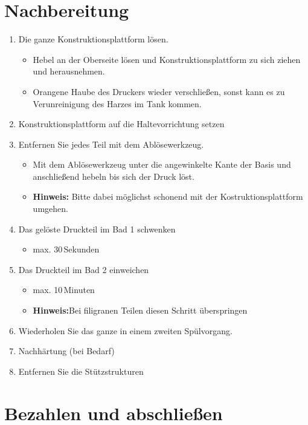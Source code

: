 \documentclass{\basedir/fablab-document}
\begin{document}
	
\section{Nachbereitung}

	\begin{enumerate}
	\item Die ganze Konstruktionsplattform lösen.
	\begin{itemize}
		\item Hebel an der Oberseite lösen und Konstruktionsplattform zu sich ziehen und herausnehmen.
		\item Orangene Haube des Druckers wieder verschließen, sonst kann es zu Verunreinigung des Harzes im Tank kommen.
	\end{itemize}
	\item Konstruktionsplattform auf die Haltevorrichtung setzen
	\item Entfernen Sie jedes Teil mit dem Ablösewerkzeug.
	\begin{itemize}
		\item Mit dem Ablösewerkzeug unter die angewinkelte Kante der Basis und anschließend hebeln bis sich der Druck löst.
		\item \textbf{Hinweis:} Bitte dabei möglichst schonend mit der Kostruktionsplattform umgehen.
	\end{itemize}
	\item Das gelöste Druckteil im Bad 1 schwenken
	\begin{itemize}
		\item max. 30\,Sekunden
	\end{itemize}
	\item Das Druckteil im Bad 2 einweichen
	\begin{itemize}
		\item max. 10\,Minuten
		\item \textbf{Hinweis:}Bei filigranen Teilen diesen Schritt überspringen
	\end{itemize}
	\item Wiederholen Sie das ganze in einem zweiten Spülvorgang.
	\item Nachhärtung (bei Bedarf)
	\item Entfernen Sie die Stützstrukturen
	
	\end{enumerate}
	
	
	\section{Bezahlen und abschließen}
	
\end{document}
